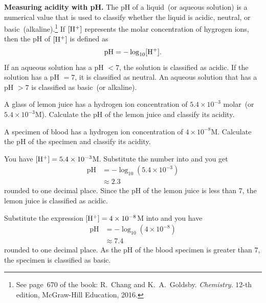\documentclass[a4paper,oneside,12pt]{article}
\begin{document}
\begin{example}
\textbf{Measuring acidity with pH.}
The pH of a liquid~(or aqueous solution) is a numerical value that is
used to classify whether the liquid is acidic, neutral, or
basic~(alkaline).\footnote{
  See page~670 of the book:
  R.~Chang and K.~A.~Goldsby. \emph{Chemistry}. $12$-th edition,
  McGraw-Hill Education, 2016.
}
If $[{\rm H}^+]$ represents the molar concentration of hygrogen ions, then
the pH of $[{\rm H}^+]$ is defined as
\begin{equation}
\label{eqn:logarithm:pH}
\text{pH}
=
-\log_{10} [{\rm H}^+].
\end{equation}
If an aqueous solution has a pH $< 7$, the solution is classified as
acidic.  If the solution has a pH $ = 7$, it is classified as
neutral.  An aqueous solution that has a pH $> 7$ is classified as
basic~(or alkaline).
\begin{packedenum}
\item\label{subex:logarithm:pH_lemon}
  A glass of lemon juice has a hydrogen ion concentration of
  $5.4 \times 10^{-3}$ molar~(or $5.4 \times 10^{-3}$M).  Calculate
  the pH of the lemon juice and classify its acidity.

\item\label{subex:logarithm:pH_blood}
  A specimen of blood has a hydrogen ion concentration of
  $4 \times 10^{-8}$M.  Calculate the pH of the specimen and classify
  its acidity.
\end{packedenum}
\end{example}

\begin{solution}
You have $[{\rm H}^+] = 5.4 \times 10^{-3}$M.  Substitute the number into
 and you get
\begin{align*}
\text{pH}
&=
-\log_{10} (5.4 \times 10^{-3}) \\[4pt]
&\approx
2.3
\end{align*}
rounded to one decimal place.  Since the pH of the lemon juice is less
than $7$, the lemon juice is classified as acidic.

Substitute the expression $[{\rm H}^+] = 4 \times 10^{-8}$M into
 and you have
\begin{align*}
\text{pH}
&=
-\log_{10} (4 \times 10^{-8}) \\[4pt]
&\approx
7.4
\end{align*}
rounded to one decimal place.  As the pH of the blood specimen is
greater than $7$, the specimen is classified as basic.
\end{solution}
\end{document}

